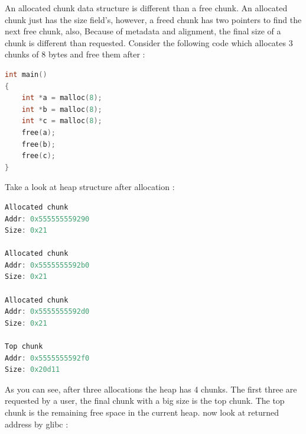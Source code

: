\documentclass{masterthesis}
\newcommand*\libc{glibc}
\begin{document}
An allocated chunk data structure is different than a free chunk. An allocated chunk just has the size field's, however, a freed chunk has two pointers to find the next free chunk, also, Because of metadata and alignment, the final size of a chunk is different than requested. Consider the following code which allocates 3 chunks of 8 bytes and free them after :

\begin{lstlisting}[language=c,frame=tlrb]
int main()
{
	int *a = malloc(8);
	int *b = malloc(8);
	int *c = malloc(8);
	free(a);
	free(b);
	free(c);
}
\end{lstlisting}

Take a look at heap structure after allocation : 

\begin{lstlisting}[language=c,frame=tlrb]
Allocated chunk
Addr: 0x555555559290
Size: 0x21

Allocated chunk
Addr: 0x5555555592b0
Size: 0x21

Allocated chunk
Addr: 0x5555555592d0
Size: 0x21

Top chunk 
Addr: 0x5555555592f0
Size: 0x20d11
\end{lstlisting}

As you can see, after three allocations the heap has 4 chunks. The first three are requested by a user, the final chunk with a big size is the top chunk. The top chunk is the remaining free space in the current heap. now look at returned address by \libc{} :
\end{document}
